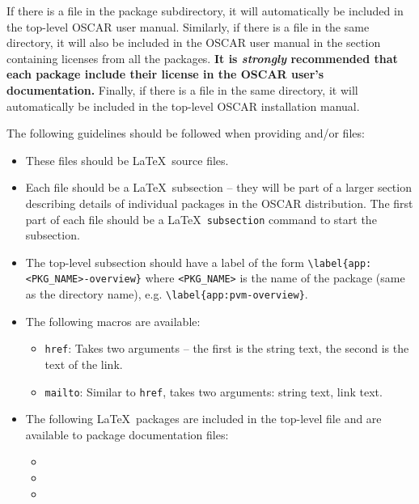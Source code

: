 If there is a file  in the  package
subdirectory, it will automatically be included in the top-level OSCAR
user manual.  
%
Similarly, if there is a file  in the same
directory, it will also be included in the OSCAR user manual in the
section containing licenses from all the packages.  {\bf It is {\em
    strongly} recommended that each package include their license in
  the OSCAR user's documentation.}
%
Finally, if there is a file  in the same directory,
it will automatically be included in the top-level OSCAR installation
manual.  

The following guidelines should be followed when providing
 and/or  files:

\begin{itemize}
\item These files should be \LaTeX\ source files.

\item Each file should be a \LaTeX\ subsection -- they will be part of
  a larger section describing details of individual packages in the
  OSCAR distribution.  The first part of each file should be a \LaTeX\
  {\tt subsection} command to start the subsection.

\item The top-level subsection should have a label of the form
      \verb=\label{app:<PKG_NAME>-overview}= where \verb=<PKG_NAME>= is
      the name of the package (same as the directory name), e.g.
         \verb=\label{app:pvm-overview}=.

\item The following macros are available:

  \begin{itemize}
  \item {\tt href}: Takes two arguments -- the first is the string
    text, the second is the text of the link.

  \item {\tt mailto}: Similar to {\tt href}, takes two arguments:
    string text, link text.
  \end{itemize}

\item The following \LaTeX\ packages are included in the top-level
  file and are available to package documentation files:

  \begin{itemize}
  \item {}
  \item {}
  \item {}
  \end{itemize}


\end{itemize}
